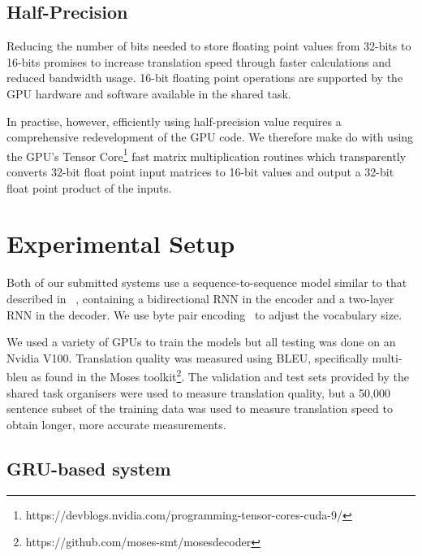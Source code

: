 \documentclass[11pt,a4paper]{article}
\begin{document}

\subsection{Half-Precision}

Reducing the number of bits needed to store floating point values from 32-bits to 16-bits promises to increase translation speed through faster calculations and reduced bandwidth usage. 16-bit floating point operations are supported by the GPU hardware and software available in the shared task.

In practise, however, efficiently using half-precision value requires a comprehensive redevelopment of the GPU code. We therefore make do with using the GPU's Tensor Core\footnote{https://devblogs.nvidia.com/programming-tensor-cores-cuda-9/} fast matrix multiplication routines which transparently converts 32-bit float point input matrices to 16-bit values and output a 32-bit float point product of the inputs.

\section{Experimental Setup}
\label{sec:Experimental Setup}

Both of our submitted systems use a sequence-to-sequence model similar to that described in ~\citet{DBLP:journals/corr/BahdanauCB14}, containing a bidirectional RNN in the encoder and a two-layer RNN in the decoder. We use byte pair encoding~\citep{sennrich-haddow-birch:2016:P16-12} to adjust the vocabulary size.

We used a variety of GPUs to train the models but all testing was done on an Nvidia V100. Translation quality was measured using BLEU, specifically multi-bleu as found in the Moses toolkit\footnote{https://github.com/moses-smt/mosesdecoder}. The validation and test sets provided by the shared task organisers were used to measure translation quality, but a 50,000 sentence subset of the training data was used to measure translation speed to obtain longer, more accurate measurements.

\subsection{GRU-based system}
\end{document}
